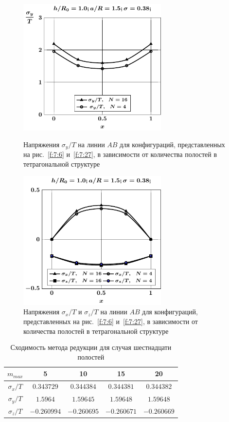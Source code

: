 \begin{figure}[h!]
\centering\footnotesize
\parbox[b]{7.5cm}{\centering\includegraphics[width=7.5cm]{cav16-4-sig_y.pdf}
\caption{Напряжения $\sigma_y/T$ на линии $AB$ для конфигураций, представленных на рис.~\ref{f:7:6} и~\ref{f:7:27}, в зависимости от количества полостей в тетрагональной структуре
\label{f:7:32}}}\hfil\hfil
\parbox[b]{7.5cm}{\centering\includegraphics[width=7.5cm]{cav16-4-sig_x_z.pdf}
\caption{Напряжения $\sigma_x/T$ и $\sigma_z/T$ на линии $AB$ для конфигураций, представленных на рис.~\ref{f:7:6} и~\ref{f:7:27}, в зависимости от количества полостей в тетрагональной структуре
\label{f:7:33}}}
\end{figure}

\begin{table}[h!]
\caption{Сходимость метода редукции для случая шестнадцати полостей}
\centering
\begin{tabular}{|c|c|c|c|c|}
\hline
$m_{max}$ & 5 & 10 & 15 & 20 \\
\hline
$\sigma_x/T$ & $0.343729$ & $0.344384$ & $0.344381$ & $0.344382$ \\
\hline
$\sigma_y/T$ & $1.5964$ & $1.59645$ & $1.59648$ & $1.59648$ \\
\hline
$\sigma_z/T$ & $-0.260994$ & $-0.260695$ & $-0.260671$ & $-0.260669$ \\
\hline
\end{tabular}
\label{t:7:5}
\end{table}

